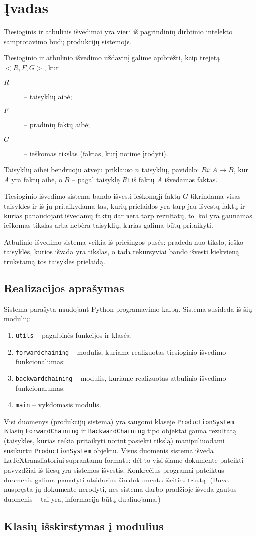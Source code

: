 \chapter{Įvadas}

Tiesioginis ir atbulinis išvedimai yra vieni iš pagrindinių dirbtinio
intelekto samprotavimo būdų produkcijų sistemoje.

Tiesioginio ir atbulinio išvedimo uždavinį galime apibrėžti, kaip
trejetą $<R, F, G>$, kur
\begin{description}
  \item[$R$] – taisyklių aibė;
  \item[$F$] – pradinių faktų aibė;
  \item[$G$] – ieškomas tikslas (faktas, kurį norime įrodyti).
\end{description}
Taisyklių aibei bendruoju atveju priklauso $n$ taisyklių, pavidalo:
$Ri: A \to B$, kur $A$ yra faktų aibė, o $B$ – pagal taisyklę
$Ri$ iš faktų $A$ išvedamas faktas.

Tiesioginio išvedimo sistema bando išvesti ieškomąjį faktą $G$
tikrindama visas taisykles ir iš jų pritaikydama tas, kurių
prielaidos yra tarp jau išvestų faktų ir kurias panaudojant išvedamų
faktų dar nėra tarp rezultatų, tol kol yra gaunamas ieškomas tikslas
arba nebėra taisyklių, kurias galima būtų pritaikyti.

Atbulinio išvedimo sistema veikia iš priešingos pusės: pradeda
nuo tikslo, ieško taisyklės, kurios išvada yra tikslas, o tada
rekursyviai bando išvesti kiekvieną trūkstamą tos taisyklės
prielaidą.

\section{Realizacijos aprašymas}

Sistema parašyta naudojant Python programavimo kalbą. Sistema susideda
iš šių modulių:
\begin{enumerate}
  \item \verb|utils| – pagalbinės funkcijos ir klasės;
  \item \verb|forwardchaining| – modulis, kuriame realizuotas
    tiesioginio išvedimo funkcionalumas;
  \item \verb|backwardchaining| – modulis, kuriame realizuotas
    atbulinio išvedimo funkcionalumas;
  \item \verb|main| – vykdomasis modulis.
\end{enumerate}

\begin{sloppypar}
Visi duomenys (produkcijų sistema) yra saugomi klasėje
\verb|ProductionSystem|. Klasių \verb|ForwardChaining| ir
\verb|BackwardChaining| tipo objektai gauna rezultatą (taisykles,
kurias reikia pritaikyti norint pasiekti tikslą) manipuliuodami
susikurtu \verb|ProductionSystem| objektu. Visus duomenis sistema
išveda \LaTeX transliatoriui suprantamu formatu: dėl to visi šiame
dokumente pateikti pavyzdžiai iš tiesų yra sistemos išvestis.
Konkrečius programai pateiktus duomenis galima pamatyti atsidarius šio
dokumento išeities tekstą. (Buvo nuspręsta jų dokumente nerodyti,
nes sistema darbo pradžioje išveda gautus duomenis – tai yra,
informacija būtų dubliuojama.)
\end{sloppypar}

\section{Klasių išskirstymas į modulius}

